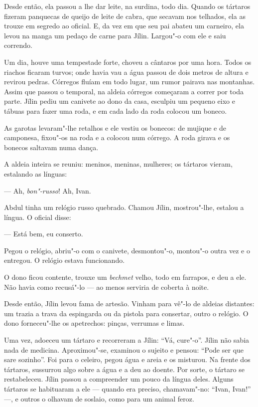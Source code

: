 Desde então, ela passou a lhe dar leite, na surdina, todo dia. Quando os
tártaros fizeram panquecas de queijo de leite de cabra, que secavam nos
telhados, ela as trouxe em segredo ao oficial. E, da vez em que seu pai
abateu um carneiro, ela levou na manga um pedaço de carne para Jílin.
Largou"-o com ele e saiu correndo.

Um dia, houve uma tempestade forte, choveu a cântaros por uma hora.
Todos os riachos ficaram turvos; onde havia vau a água passou de dois
metros de altura e revirou pedras. Córregos fluíam em todo lugar, um
rumor pairava nas montanhas. Assim que passou o temporal, na aldeia
córregos começaram a correr por toda parte. Jílin pediu um canivete ao
dono da casa, esculpiu um pequeno eixo e tábuas para fazer uma roda, e
em cada lado da roda colocou um boneco.

As garotas levaram"-lhe retalhos e ele vestiu os bonecos: de mujique e de
camponesa, fixou"-os na roda e a colocou num córrego. A roda girava e os
bonecos saltavam numa dança.

A aldeia inteira se reuniu: meninos, meninas, mulheres; os tártaros
vieram, estalando as línguas:

--- Ah, \emph{bon"-russo}! Ah, Ivan.

Abdul tinha um relógio russo quebrado. Chamou Jílin, mostrou"-lhe,
estalou a língua. O oficial disse:

--- Está bem, eu conserto.

Pegou o relógio, abriu"-o com o canivete, desmontou"-o, montou"-o outra vez
e o entregou. O relógio estava funcionando.

O dono ficou contente, trouxe um \emph{bechmet} velho, todo em farrapos,
e deu a ele. Não havia como recusá"-lo --- ao menos serviria de coberta à
noite.

Desde então, Jílin levou fama de artesão. Vinham para vê"-lo de aldeias
distantes: um trazia a trava da espingarda ou da pistola para consertar,
outro o relógio. O dono forneceu"-lhe os apetrechos: pinças, verrumas e
limas.

Uma vez, adoeceu um tártaro e recorreram a Jílin: ``Vá, cure"-o''. Jílin
não sabia nada de medicina. Aproximou"-se, examinou o sujeito e pensou:
``Pode ser que sare sozinho''. Foi para o celeiro, pegou água e areia e
os misturou. Na frente dos tártaros, sussurrou algo sobre a água e a deu
ao doente. Por sorte, o tártaro se restabeleceu. Jílin passou a
compreender um pouco da língua deles. Alguns tártaros se habituaram a
ele --- quando era preciso, chamavam"-no: ``Ivan, Ivan!'' ---, e outros o
olhavam de soslaio, como para um animal feroz.

